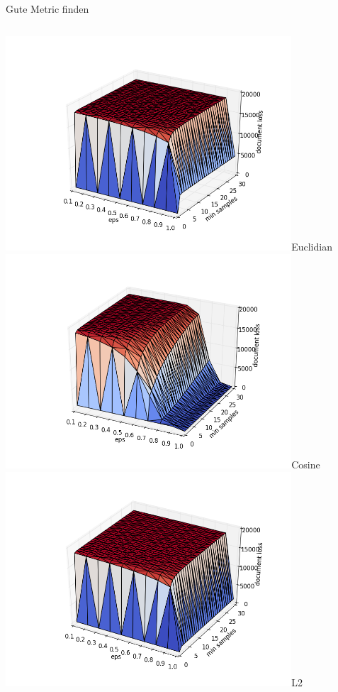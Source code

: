\documentclass[compress,t]{beamer}
\begin{document}
\begin{frame}{Gute Metric finden}

    \begin{columns}[t]
        \centering
        \includegraphics[width=0.8\textwidth]{img/1_euclidian.png}{Euclidian}\\
        \includegraphics[width=0.8\textwidth]{img/2_cosine_brute.png}{Cosine}
        \centering
        \includegraphics[width=0.8\textwidth]{img/3_l2.png}{L2}\\

\end{columns}
\end{frame}
\end{document}
